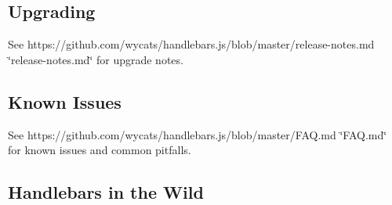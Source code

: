 \subsection*{Upgrading }

See https\+://github.com/wycats/handlebars.\+js/blob/master/release-\/notes.md \char`\"{}release-\/notes.\+md\char`\"{} for upgrade notes.

\subsection*{Known Issues }

See https\+://github.com/wycats/handlebars.\+js/blob/master/\+F\+AQ.md \char`\"{}\+F\+A\+Q.\+md\char`\"{} for known issues and common pitfalls.

\subsection*{Handlebars in the Wild }


